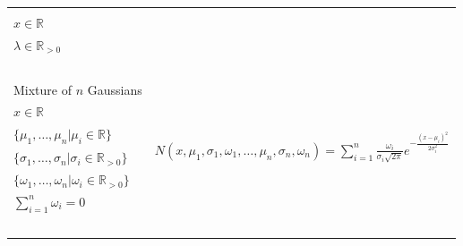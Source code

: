 \documentclass[xcolor={table}]{beamer}
\begin{document}
\begin{frame}
\begin{table}
\begin{tiny}
\begin{tabular}{ l l }
{}\\
$x \in \mathbb{R}$ & ~ \\
$\lambda \in \mathbb{R}_{>0}$ &  ~ \\
~ & ~   \\
Mixture of $n$ Gaussians & \multirow{6}{*}{$\displaystyle N(x, \mu_1, \sigma_1, \omega_1, \dots, \mu_n, \sigma_n, \omega_n) = \sum_{i=1}^{n} \frac{\omega_i}{\sigma_i \sqrt{2\pi } }e^{\displaystyle -\frac{ (x-\mu_i )^2}{2\sigma_{i}^2}} $}\\
$x \in \mathbb{R} $ & \\
$\{\mu_1, \dots, \mu_n | \mu_i \in \mathbb{R} \}  $ &  \\
$\{\sigma_1, \dots, \sigma_n | \sigma_i \in \mathbb{R}_{>0} \}$ &  \\
$\{\omega_1, \dots, \omega_n | \omega_i \in \mathbb{R}_{>0}\} $ &  \\
$\sum_{i=1}^{n} \omega_i = 0$ &  \\
~ & ~   \\
\hline
\end{tabular}
\end{tiny}
\end{table}
\end{frame} 
\end{document}
